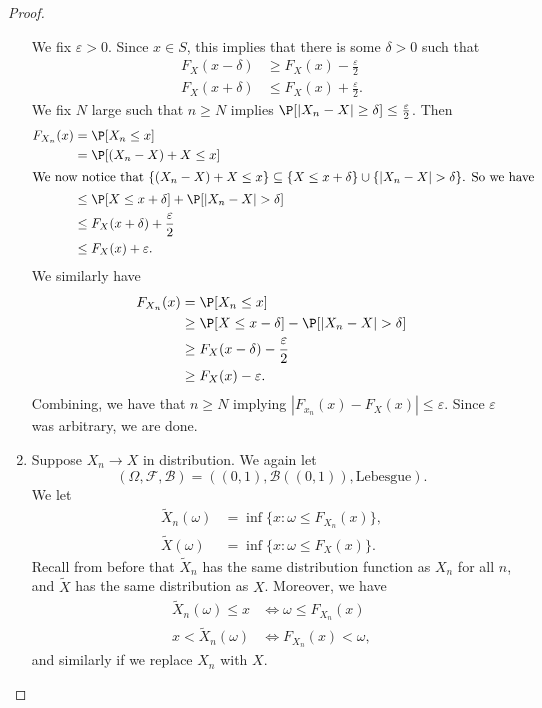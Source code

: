 \documentclass[a4paper]{article}
\begin{document}
\begin{proof}
\begin{enumerate}
      We fix $\varepsilon > 0$. Since $x \in S$, this implies that there is some $\delta > 0$ such that
      \begin{align*}
        F_X(x - \delta) &\geq F_X(x) - \frac{\varepsilon}{2}\\
        F_X(x + \delta) & \leq F_X(x) + \frac{\varepsilon}{2}.
      \end{align*}
      We fix $N$ large such that $n \geq N$ implies $\P[|X_n - X| \geq \delta] \leq \frac{\varepsilon}{2}$. Then
      \begin{align*}
        F_{X_n}(x) &= \P[X_n \leq x] \\
        &= \P[(X_n - X) + X \leq x] \\
        \intertext{We now notice that $\{(X_n - X) + X \leq x\} \subseteq \{X \leq x + \delta\} \cup \{|X_n - X| > \delta\}$. So we have}
        &\leq \P[X \leq x + \delta] + \P[|X_n - X| > \delta]\\
        &\leq F_X(x + \delta) + \frac{\varepsilon}{2}\\
        &\leq F_X(x) + \varepsilon.
       \end{align*}
       We similarly have
       \begin{align*}
         F_{X_n}(x) &= \P[X_n \leq x] \\
         &\geq \P[X \leq x - \delta] - \P[|X_n - X| > \delta]\\
         &\geq F_X(x - \delta) - \frac{\varepsilon}{2}\\
         &\geq F_X(x) - \varepsilon.
       \end{align*}
       Combining, we have that $n \geq N$ implying $|F_{x_n}(x) - F_X(x)| \leq \varepsilon$. Since $\varepsilon$ was arbitrary, we are done.
     \item Suppose $X_n \to X$ in distribution. We again let
       \[
         (\Omega, \mathcal{F}, \mathcal{B}) = ((0, 1), \mathcal{B}((0, 1)), \text{Lebesgue}).
       \]
       We let
       \begin{align*}
         \tilde{X}_n(\omega) &= \inf\{x : \omega \leq F_{X_n}(x)\},\\
         \tilde{X}(\omega) &= \inf \{x : \omega \leq F_X(x)\}.
       \end{align*}
       Recall from before that $\tilde{X}_n$ has the same distribution function as $X_n$ for all $n$, and $\tilde{X}$ has the same distribution as $X$. Moreover, we have
       \begin{align*}
         \tilde{X}_n(\omega) \leq x &\Leftrightarrow \omega \leq F_{X_n}(x)\\
         x < \tilde{X}_n(\omega) &\Leftrightarrow F_{X_n}(x) < \omega,
       \end{align*}
       and similarly if we replace $X_n$ with $X$.


\end{enumerate}
\end{proof}
\end{document}

